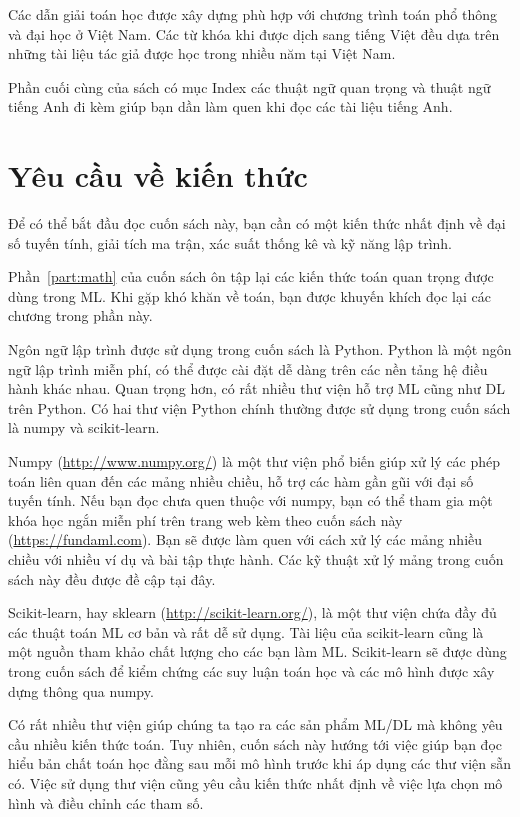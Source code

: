 Các dẫn giải toán học được xây dựng phù hợp với chương trình toán phổ thông và
đại học ở Việt Nam. Các từ khóa khi được dịch sang tiếng Việt đều dựa trên những
tài liệu tác giả được học trong nhiều năm tại Việt Nam.

Phần cuối cùng của sách có mục Index các thuật ngữ quan trọng và thuật ngữ tiếng Anh đi kèm giúp bạn dần làm quen khi đọc các tài liệu tiếng Anh. 


\section{Yêu cầu về kiến thức}

Để có thể bắt đầu đọc cuốn sách này, bạn cần có một kiến thức nhất định về đại
số tuyến tính, giải tích ma trận, xác suất thống kê và kỹ năng lập trình.

Phần~\ref{part:math} của cuốn sách ôn tập lại các kiến thức toán quan trọng được
dùng trong ML. Khi gặp khó khăn về toán, bạn được khuyến khích đọc lại các
chương trong phần này.

Ngôn ngữ lập trình được sử dụng trong cuốn sách là Python. Python là một ngôn
ngữ lập trình miễn phí, có thể được cài đặt dễ dàng trên các nền tảng hệ điều
hành khác nhau. Quan trọng hơn, có rất nhiều thư viện hỗ trợ ML cũng như DL
trên Python. Có hai thư viện Python chính thường được sử dụng trong
cuốn sách là numpy và scikit-learn. 

Numpy (\url{http://www.numpy.org/}) là một thư viện phổ biến giúp xử lý các phép
toán liên quan đến các mảng nhiều chiều, hỗ trợ các hàm gần gũi với đại số tuyến
tính. Nếu bạn đọc chưa quen thuộc với numpy, bạn có thể tham gia một khóa học
ngắn miễn phí trên trang web kèm theo cuốn sách này (\url{https://fundaml.com}).
Bạn sẽ được làm quen với cách xử lý các mảng nhiều chiều với nhiều ví dụ và bài
tập thực hành. Các kỹ thuật xử lý mảng trong cuốn sách này đều được đề cập tại
đây.

Scikit-learn, hay sklearn (\url{http://scikit-learn.org/}), là một thư viện chứa
đầy đủ các thuật toán ML cơ bản và rất dễ sử dụng. Tài liệu của scikit-learn
cũng là một nguồn tham khảo chất lượng cho các bạn làm ML. Scikit-learn sẽ được
dùng trong cuốn sách để kiểm chứng các suy luận toán học và các mô hình được xây
dựng thông qua numpy.

Có rất nhiều thư viện giúp chúng ta tạo ra các sản phẩm ML/DL mà không yêu
cầu nhiều kiến thức toán. Tuy nhiên, cuốn sách này hướng tới việc giúp bạn đọc
hiểu bản chất toán học đằng sau mỗi mô hình trước khi áp dụng các thư viện sẵn
có. Việc sử dụng thư viện cũng yêu cầu kiến thức nhất định về việc lựa chọn mô
hình và điều chỉnh các tham số.
